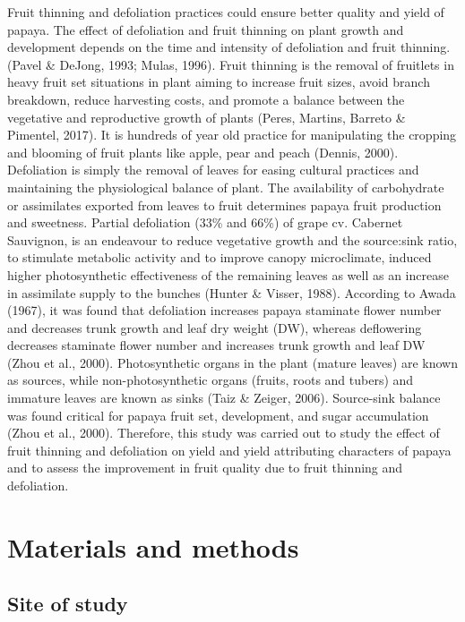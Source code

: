 \documentclass[]{article}
\begin{document}
Fruit thinning and defoliation practices could ensure better quality and
yield of papaya. The effect of defoliation and fruit thinning on plant
growth and development depends on the time and intensity of defoliation
and fruit thinning. (Pavel \& DeJong, 1993; Mulas, 1996). Fruit thinning
is the removal of fruitlets in heavy fruit set situations in plant
aiming to increase fruit sizes, avoid branch breakdown, reduce
harvesting costs, and promote a balance between the vegetative and
reproductive growth of plants (Peres, Martins, Barreto \& Pimentel,
2017). It is hundreds of year old practice for manipulating the cropping
and blooming of fruit plants like apple, pear and peach (Dennis, 2000).
Defoliation is simply the removal of leaves for easing cultural
practices and maintaining the physiological balance of plant. The
availability of carbohydrate or assimilates exported from leaves to
fruit determines papaya fruit production and sweetness. Partial
defoliation (33\% and 66\%) of grape cv. Cabernet Sauvignon, is an
endeavour to reduce vegetative growth and the source:sink ratio, to
stimulate metabolic activity and to improve canopy microclimate, induced
higher photosynthetic effectiveness of the remaining leaves as well as
an increase in assimilate supply to the bunches (Hunter \& Visser,
1988). According to Awada (1967), it was found that defoliation
increases papaya staminate flower number and decreases trunk growth and
leaf dry weight (DW), whereas deflowering decreases staminate flower
number and increases trunk growth and leaf DW (Zhou et al., 2000).
Photosynthetic organs in the plant (mature leaves) are known as sources,
while non-photosynthetic organs (fruits, roots and tubers) and immature
leaves are known as sinks (Taiz \& Zeiger, 2006). Source-sink balance
was found critical for papaya fruit set, development, and sugar
accumulation (Zhou et al., 2000). Therefore, this study was carried out
to study the effect of fruit thinning and defoliation on yield and yield
attributing characters of papaya and to assess the improvement in fruit
quality due to fruit thinning and defoliation.

\section{Materials and methods}\label{materials-and-methods}

\subsection{Site of study}\label{site-of-study}
\end{document}
